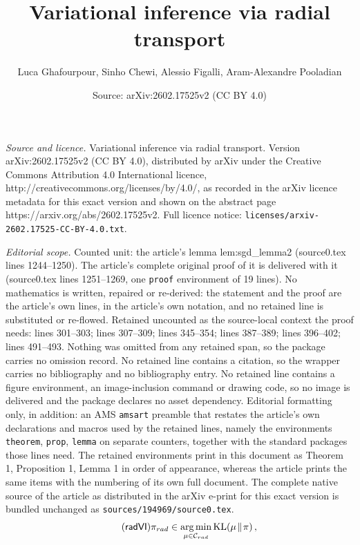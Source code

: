 \documentclass[10pt,a4paper]{amsart}
\title{Variational inference via radial transport}
\author{Luca Ghafourpour, Sinho Chewi, Alessio Figalli, Aram-Alexandre Pooladian}
\date{Source: arXiv:2602.17525v2 (CC BY 4.0)}
\newcommand{\Crad}{\cC_{\rm rad}}
\DeclareMathOperator*{\KL}{KL}
\DeclareMathOperator*{\argmin}{arg\,min}
\newcommand{\cC}{\mathcal{C}}
\newcommand{\kl}[2]{\KL(#1 \!\;\|\; \!#2)}
\begin{document}
\maketitle

\noindent\emph{Source and licence.} Variational inference via radial transport. Version arXiv:2602.17525v2 (CC BY 4.0), distributed by arXiv under the Creative Commons Attribution 4.0 International licence, http://creativecommons.org/licenses/by/4.0/, as recorded in the arXiv licence metadata for this exact version and shown on the abstract page https://arxiv.org/abs/2602.17525v2. Full licence notice: \texttt{licenses/arxiv-2602.17525-CC-BY-4.0.txt}.\par\smallskip

\noindent\textit{Editorial scope.} Counted unit: the article's lemma lem:sgd\_lemma2 (source0.tex lines 1244--1250). The article's complete original proof of it is delivered with it (source0.tex lines 1251--1269, one \texttt{proof} environment of 19 lines). No mathematics is written, repaired or re-derived: the statement and the proof are the article's own lines, in the article's own notation, and no retained line is substituted or re-flowed.  Retained uncounted as the source-local context the proof needs: lines 301--303; lines 307--309; lines 345--354; lines 387--389; lines 396--402; lines 491--493.  Nothing was omitted from any retained span, so the package carries no omission record.  No retained line contains a citation, so the wrapper carries no bibliography and no bibliography entry.  No retained line contains a figure environment, an image-inclusion command or drawing code, so no image is delivered and the package declares no asset dependency.  Editorial formatting only, in addition: an AMS \texttt{amsart} preamble that restates the article's own declarations and macros used by the retained lines, namely the environments \texttt{theorem}, \texttt{prop}, \texttt{lemma} on separate counters, together with the standard packages those lines need.  The retained environments print in this document as Theorem 1, Proposition 1, Lemma 1 in order of appearance, whereas the article prints the same items with the numbering of its own full document.  The complete native source of the article as distributed in the arXiv e-print for this exact version is bundled unchanged as \texttt{sources/194969/source0.tex}.
\begin{align}\label{eq:radvi}\tag{$\mathsf{radVI}$}
    \pi_{\rm rad} \in \argmin_{\mu \in \Crad} \kl{\mu}{\pi}\,,
\end{align}
\end{document}
